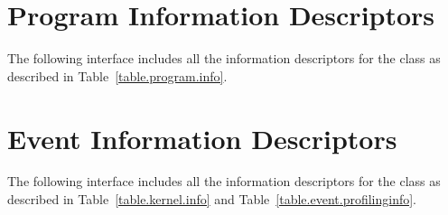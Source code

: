 \section{Program Information Descriptors}
\label{appendix.program.descriptors}
The following interface includes all the information descriptors
for the  class as described in Table~\ref{table.program.info}.



\section{Event Information Descriptors}
\label{appendix.event.descriptors}
The following interface includes all the information descriptors
for the  class as described in Table~\ref{table.kernel.info}
and Table~\ref{table.event.profilinginfo}.

